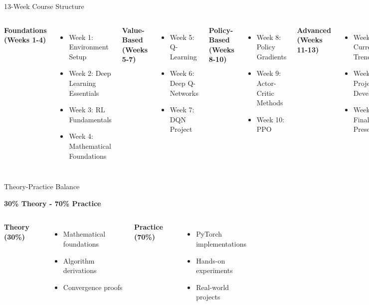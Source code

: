 \documentclass[aspectratio=169,10pt]{beamer}
\begin{document}
\begin{frame}{13-Week Course Structure}
\begin{columns}
\textbf{Foundations (Weeks 1-4)}
\begin{itemize}
    \item Week 1: Environment Setup
    \item Week 2: Deep Learning Essentials
    \item Week 3: RL Fundamentals
    \item Week 4: Mathematical Foundations
\end{itemize}

\textbf{Value-Based (Weeks 5-7)}
\begin{itemize}
    \item Week 5: Q-Learning
    \item Week 6: Deep Q-Networks
    \item Week 7: DQN Project
\end{itemize}

\textbf{Policy-Based (Weeks 8-10)}
\begin{itemize}
    \item Week 8: Policy Gradients
    \item Week 9: Actor-Critic Methods
    \item Week 10: PPO
\end{itemize}

\textbf{Advanced (Weeks 11-13)}
\begin{itemize}
    \item Week 11: Current Trends
    \item Week 12: Project Development
    \item Week 13: Final Presentations
\end{itemize}
\end{columns}
\end{frame}

\begin{frame}{Theory-Practice Balance}
\begin{center}
\Large{\textbf{30\% Theory - 70\% Practice}}
\end{center}

\begin{columns}
\textbf{Theory (30\%)}
\begin{itemize}
    \item Mathematical foundations
    \item Algorithm derivations
    \item Convergence proofs
\end{itemize}

\textbf{Practice (70\%)}
\begin{itemize}
    \item PyTorch implementations
    \item Hands-on experiments
    \item Real-world projects
\end{itemize}
\end{columns}
\end{frame}
\end{document}
